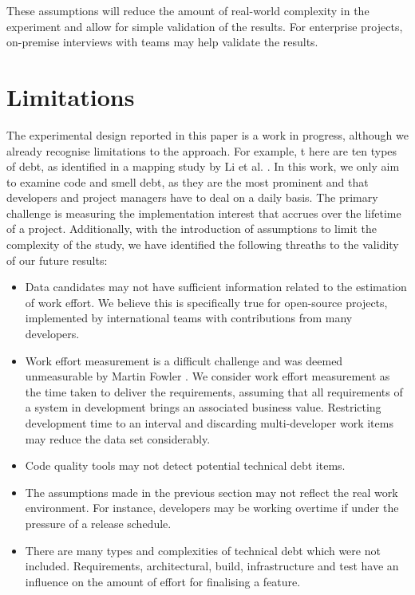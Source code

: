 These assumptions will reduce the amount of real-world complexity in the
experiment and allow for simple validation of the results. For enterprise
projects, on-premise interviews with teams may help validate the results.

\section{Limitations}
\label{limitations}

The experimental design reported in this paper is a work in progress, although
we already recognise limitations to the approach.  For example, t here are ten
types of debt, as identified in a mapping study by Li et al.  \cite{Li2015}. In
this work, we only aim to examine code and smell debt, as they are the most
prominent and that developers and project managers have to deal on a daily
basis. The primary challenge is measuring the implementation interest that
accrues over the lifetime of a project. Additionally, with the introduction of
assumptions to limit the complexity of the study, we have identified the
following threaths to the validity of our future results:

\begin{itemize}
	\item Data candidates may not have sufficient information related to the
	      estimation of work effort. We believe this is specifically true for
	      open-source projects, implemented by international teams with
	      contributions from many developers.
	\item Work effort measurement is a difficult challenge and was deemed
	      unmeasurable by Martin Fowler \cite{CannotMeasureProductivity}. We
	      consider work effort measurement as the time taken to deliver the
	      requirements, assuming that all requirements of a system in
	      development brings an associated business value. Restricting
	      development time to an interval and discarding multi-developer work
	      items may reduce the data set considerably.
	\item Code quality tools may not detect potential technical debt items.
	\item The assumptions made in the previous section may not reflect the
	      real work environment. For instance, developers may be working
	      overtime if under the pressure of a release schedule.
	\item There are many types and complexities of technical debt which were not
	      included. Requirements, architectural, build, infrastructure and test
	      have an influence on the amount of effort for finalising a feature.
\end{itemize}

